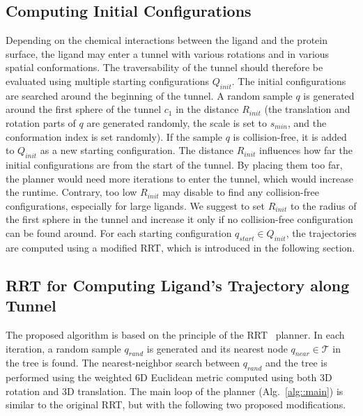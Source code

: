 \documentclass[usletter, 10pt, conference]{ieeeconf} %
\def\qrand{q_{rand}}
\def\qstart{q_{start}}
\def\qinit{\qstart}
\def\qgoal{q_{goal}}
\def\qnear{q_{near}}
\def\T{\mathcal{T}}
\def\QI{Q_{init}}
\def\RI{R_{init}}
\def\smin{s_{min}}
\begin{document}
\subsection{Computing Initial Configurations}

Depending on the chemical interactions between the ligand and the protein surface, the ligand may enter a tunnel with various rotations and in various spatial conformations.
The traversability of the tunnel should therefore be evaluated using multiple starting configurations $\QI$.
The initial configurations are searched around the beginning of the tunnel.
A random sample $q$ is generated around the first sphere of the tunnel 
$c_1$ in the distance $\RI$ (the translation and rotation parts of $q$ are generated randomly, the scale is set to $\smin$, and the conformation index is set randomly).
If the sample $q$ is collision-free, it is added to $\QI$ as a new starting configuration.
The distance $\RI$ influences how far the initial configurations are from the start of the tunnel.
By placing them too far, the planner would need more iterations to enter the tunnel, which would increase the runtime.
Contrary, too low $\RI$ may disable to find any collision-free configurations, especially for large ligands.
We suggest to set $\RI$ to the radius of the first sphere in the tunnel and increase it only if no collision-free configuration
can be found around.
For each starting configuration $\qinit \in \QI$, the trajectories are computed using a modified RRT, which is introduced in the following section.


\subsection{RRT for Computing Ligand's Trajectory along Tunnel}

The proposed algorithm is based on the principle of the RRT~\cite{lavalleRRT} planner.
In each iteration, a random sample $\qrand$ is generated and its nearest node $\qnear\in\T$ in the tree is found.
The nearest-neighbor search between $\qrand$ and the tree is performed using the weighted 6D Euclidean metric computed using
both 3D rotation and 3D translation.
The main loop of the planner (Alg.~\ref{alg::main}) is similar to the original RRT, but with the following two proposed modifications.
\end{document}
